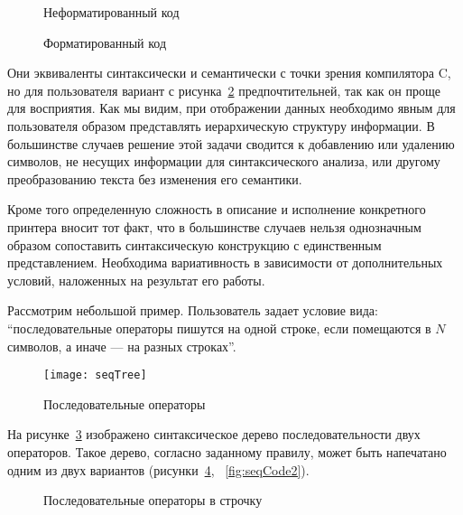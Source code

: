 \begin{figure}[h!]
	\centering
	
	\caption{Неформатированный код}
	\label{fig:wikiExUnfor}
\end{figure}

\begin{figure}[h!]
	\centering
	
	\caption{Форматированный код}
	\label{fig:wikiExBSD}
\end{figure}

Они эквиваленты синтаксически и семантически с точки зрения компилятора C, но для пользователя вариант с рисунка~\ref{fig:wikiExBSD} предпочтительней, так как он проще для восприятия. Как мы видим, при отображении данных необходимо явным для пользователя образом представлять иерархическую структуру информации. В большинстве случаев решение этой задачи сводится к добавлению или удалению символов, не несущих информации для синтаксического анализа, или другому преобразованию текста без изменения его семантики.

Кроме того определенную сложность в описание и исполнение конкретного принтера вносит тот факт, что в большинстве случаев нельзя однозначным образом сопоставить синтаксическую конструкцию с единственным представлением. Необходима вариативность в зависимости от дополнительных условий, наложенных на результат его работы.

Рассмотрим небольшой пример. Пользователь задает условие вида: ``последовательные операторы пишутся на одной строке, если помещаются в $N$ символов, а иначе --- на разных строках''.

\begin{figure}[h!]
	\centering
	\texttt{[image: seqTree]}
	\caption{Последовательные операторы}
	\label{fig:seqImage}
\end{figure}

На рисунке~\ref{fig:seqImage} изображено синтаксическое дерево последовательности двух операторов. Такое дерево, согласно заданному правилу, может быть напечатано одним из двух вариантов (рисунки~\ref{fig:seqCode1}, ~\ref{fig:seqCode2}).

\begin{figure}[h!]
	\centering
	
	\caption{Последовательные операторы в строчку}
	\label{fig:seqCode1}
\end{figure}

